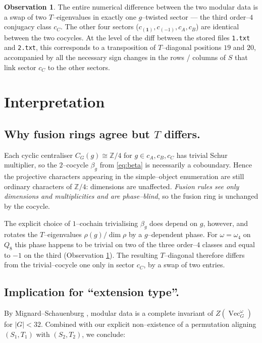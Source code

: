 \documentclass[11pt,a4paper]{amsart}
\theoremstyle{plain}
\theoremstyle{definition}
\newtheorem{observation}[theorem]{Observation}
\DeclareMathOperator{\Vec}{Vec}
\newcommand{\Drinfeld}[2]{Z\!\left(\Vec_{#1}^{#2}\right)}
\newcommand{\trivcoc}{\mathbf{1}}
\begin{document}
\begin{observation}
\label{obs:onesector}
The entire numerical difference between the two modular data is a swap
of two $T$--eigenvalues in exactly one $g$--twisted sector --- the third
order--$4$ conjugacy class $c_C$. The other four sectors
($c_{(\trivcoc)},c_{(-1)},c_A,c_B$) are identical between the two cocycles.
At the level of the diff between the stored files
\verb|1.txt| and \verb|2.txt|, this corresponds to a transposition of
$T$--diagonal positions $19$ and $20$, accompanied by all the necessary
sign changes in the rows / columns of $S$ that link sector $c_C$ to the
other sectors.
\end{observation}

\section{Interpretation}

\subsection*{Why fusion rings agree but $T$ differs.}
Each cyclic centraliser $C_G(g)\cong\mathbb Z/4$ for $g\in c_A,c_B,c_C$
has trivial Schur multiplier, so the $2$--cocycle $\beta_g$ from
\eqref{eq:beta} is necessarily a coboundary. Hence the projective
characters appearing in the simple--object enumeration are still
ordinary characters of $\mathbb Z/4$: dimensions are unaffected.
\emph{Fusion rules see only dimensions and multiplicities and are
phase--blind}, so the fusion ring is unchanged by the cocycle.

The explicit choice of $1$--cochain trivialising $\beta_g$ does depend
on $g$, however, and rotates the $T$--eigenvalues
$\rho(g)/\dim\rho$ by a $g$--dependent phase. For $\omega=\omega_4$ on
$Q_8$ this phase happens to be trivial on two of the three order--$4$
classes and equal to $-1$ on the third (Observation
\ref{obs:onesector}). The resulting $T$--diagonal therefore differs from
the trivial--cocycle one only in sector $c_C$, by a swap of two entries.

\subsection*{Implication for ``extension type''.}
By Mignard--Schauenburg \cite[Theorem on modular data
completeness]{MignardSchauenburg}, modular data is a complete invariant
of $\Drinfeld{G}{\omega}$ for $|G|<32$. Combined with our explicit
non--existence of a permutation aligning $(S_1,T_1)$ with $(S_2,T_2)$,
we conclude:
\end{document}
